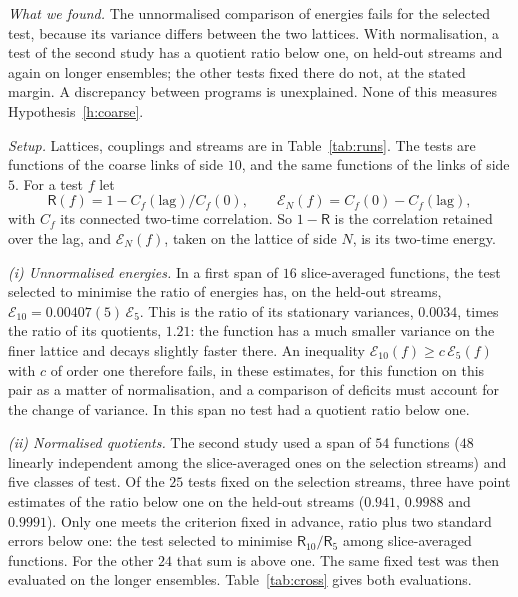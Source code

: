 \emph{What we found.} The unnormalised comparison of energies fails for the selected test, because its variance differs
between the two lattices. With normalisation, a test of the second study has a quotient ratio below
one, on held-out streams and again on longer ensembles; the other tests fixed there do not, at the stated
margin. A discrepancy between programs is unexplained. None of this measures
Hypothesis~\ref{h:coarse}.

\emph{Setup.} Lattices, couplings and streams are in Table~\ref{tab:runs}. The tests are functions of the
coarse links of side $10$, and the same functions of the links of side $5$. For a test $f$ let
\[
\mathsf R(f)=1-C_f(\mathrm{lag})/C_f(0),\qquad \mathcal E_N(f)=C_f(0)-C_f(\mathrm{lag}),
\]
with $C_f$ its connected two-time correlation. So $1-\mathsf R$ is the correlation retained over the lag, and
$\mathcal E_N(f)$, taken on the lattice of side $N$, is its two-time energy.

\emph{{\upshape(i)} Unnormalised energies.} In a first span of $16$ slice-averaged functions, the test
selected to minimise the ratio of energies has, on the held-out streams,
$\mathcal E_{10}=0.00407(5)\,\mathcal E_5$. This is the ratio of its stationary variances, $0.0034$, times the
ratio of its quotients, $1.21$: the function has a much smaller variance on the finer lattice and decays
slightly faster there. An inequality $\mathcal E_{10}(f)\ge c\,\mathcal E_5(f)$ with $c$ of order one
therefore fails, in these estimates, for this function on this pair as a matter of normalisation, and a comparison of deficits
must account for the change of variance. In this span no test had a quotient ratio below one.

\emph{{\upshape(ii)} Normalised quotients.} The second study used a span of $54$ functions ($48$ linearly
independent among the slice-averaged ones on the selection streams) and five classes of test. Of the $25$
tests fixed on the selection streams, three have point estimates of the ratio below one on the held-out
streams ($0.941$, $0.9988$ and $0.9991$). Only one meets the criterion fixed in advance, ratio plus two
standard errors below one: the test selected to minimise $\mathsf R_{10}/\mathsf R_5$ among slice-averaged
functions. For the other $24$ that sum is above one. The same fixed test was then evaluated on the longer ensembles.
Table~\ref{tab:cross} gives both evaluations.

